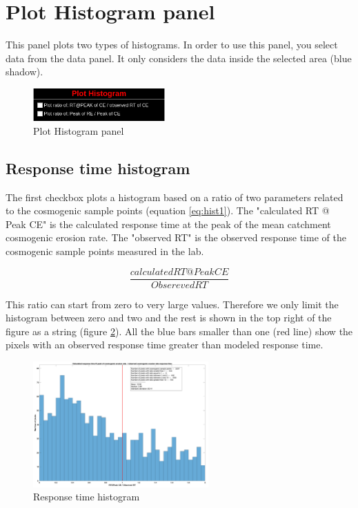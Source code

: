 \documentclass[11pt,a4paper,titlepage]{report}
\begin{document}
\section{Plot Histogram panel}
This panel plots two types of histograms. In order to use this panel, you select data from the data panel. It only considers the data inside the selected area (blue shadow).

\begin{figure}[H]
    \centering
    \includegraphics[width=0.45\textwidth]{plothist.png}
    \caption[Plot Histogram panel]{Plot Histogram panel}
    \label{fig:plothist}    
\end{figure}

\subsection{Response time histogram}

The first checkbox plots a histogram based on a ratio of two parameters related to the cosmogenic sample points (equation \ref{eq:hist1}). The "calculated RT @ Peak CE" is the calculated response time at the peak of the mean catchment cosmogenic erosion rate. The "observed RT" is the observed response time of the cosmogenic sample points measured in the lab. 

\begin{equation}
\frac{calculated RT @ Peak CE}{Obsereved RT}
\label{eq:hist1}
\end{equation}

This ratio can start from zero to very large values. Therefore we only limit the histogram between zero and two and the rest is shown in the top right of the figure as a string (figure \ref{fig:hist_RT}). All the blue bars smaller than one (red line) show the pixels with an observed response time greater than modeled response time.

\begin{figure}[H]
    \centering
    \includegraphics[width=0.6\textwidth]{hist_RT.png}
    \caption[Response time histogram]{Response time histogram}
    \label{fig:hist_RT}    
\end{figure}
\end{document}
